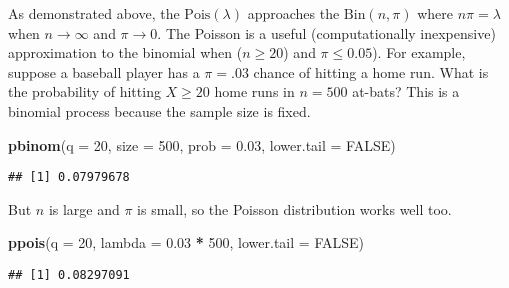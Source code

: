 \documentclass[
]{book}
\newenvironment{Shaded}{\begin{snugshade}}{\end{snugshade}}
\newcommand{\DataTypeTok}[1]{\textcolor[rgb]{0.13,0.29,0.53}{#1}}
\newcommand{\DecValTok}[1]{\textcolor[rgb]{0.00,0.00,0.81}{#1}}
\newcommand{\FloatTok}[1]{\textcolor[rgb]{0.00,0.00,0.81}{#1}}
\newcommand{\KeywordTok}[1]{\textcolor[rgb]{0.13,0.29,0.53}{\textbf{#1}}}
\newcommand{\NormalTok}[1]{#1}
\newcommand{\OperatorTok}[1]{\textcolor[rgb]{0.81,0.36,0.00}{\textbf{#1}}}
\newcommand{\OtherTok}[1]{\textcolor[rgb]{0.56,0.35,0.01}{#1}}
\newcommand{\StringTok}[1]{\textcolor[rgb]{0.31,0.60,0.02}{#1}}
\begin{document}
As demonstrated above, the \(\mathrm{Pois}(\lambda)\) approaches the \(\mathrm{Bin}(n, \pi)\) where \(n\pi = \lambda\) when \(n \rightarrow \infty\) and \(\pi \rightarrow 0\). The Poisson is a useful (computationally inexpensive) approximation to the binomial when (\(n \ge 20\)) and \(\pi \le 0.05\)). For example, suppose a baseball player has a \(\pi = .03\) chance of hitting a home run. What is the probability of hitting \(X \ge 20\) home runs in \(n = 500\) at-bats? This is a binomial process because the sample size is fixed.

\begin{Shaded}
\begin{Highlighting}[]
\KeywordTok{pbinom}\NormalTok{(}\DataTypeTok{q =} \DecValTok{20}\NormalTok{, }\DataTypeTok{size =} \DecValTok{500}\NormalTok{, }\DataTypeTok{prob =} \FloatTok{0.03}\NormalTok{, }\DataTypeTok{lower.tail =} \OtherTok{FALSE}\NormalTok{)}
\end{Highlighting}
\end{Shaded}

\begin{verbatim}
## [1] 0.07979678
\end{verbatim}

But \(n\) is large and \(\pi\) is small, so the Poisson distribution works well too.

\begin{Shaded}
\begin{Highlighting}[]
\KeywordTok{ppois}\NormalTok{(}\DataTypeTok{q =} \DecValTok{20}\NormalTok{, }\DataTypeTok{lambda =} \FloatTok{0.03} \OperatorTok{*}\StringTok{ }\DecValTok{500}\NormalTok{, }\DataTypeTok{lower.tail =} \OtherTok{FALSE}\NormalTok{)}
\end{Highlighting}
\end{Shaded}

\begin{verbatim}
## [1] 0.08297091
\end{verbatim}
\end{document}
